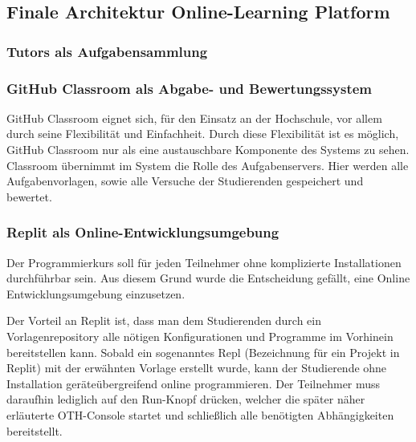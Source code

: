 \subsection{Finale Architektur Online-Learning Platform}
\subsubsection{Tutors als Aufgabensammlung}
\subsubsection{GitHub Classroom als Abgabe- und Bewertungssystem}
GitHub Classroom eignet sich, für den Einsatz an der Hochschule, vor allem durch
seine Flexibilität und Einfachheit. Durch diese Flexibilität ist es möglich,
GitHub Classroom nur als eine austauschbare Komponente des Systems zu sehen.
Classroom übernimmt im System die Rolle des Aufgabenservers. Hier werden alle
Aufgabenvorlagen, sowie alle Versuche der Studierenden gespeichert und bewertet.

\subsubsection{Replit als Online-Entwicklungsumgebung}
Der Programmierkurs soll für jeden Teilnehmer ohne komplizierte Installationen
durchführbar sein. Aus diesem Grund wurde die Entscheidung gefällt, eine
Online Entwicklungsumgebung einzusetzen.

Der Vorteil an Replit ist, dass man dem Studierenden durch ein
Vorlagenrepository alle nötigen Konfigurationen und Programme im Vorhinein
bereitstellen kann. Sobald ein sogenanntes \glqq Repl\grqq{} (Bezeichnung für
ein Projekt in Replit) mit der erwähnten Vorlage erstellt wurde, kann der
Studierende ohne Installation geräteübergreifend online programmieren. Der
Teilnehmer muss daraufhin lediglich auf den \glqq Run\grqq{}-Knopf drücken,
welcher die später näher erläuterte \glqq OTH-Console\grqq{} startet und
schließlich alle benötigten Abhängigkeiten bereitstellt.
